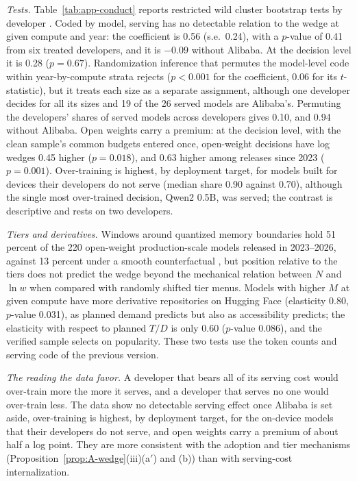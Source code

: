 \textit{Tests.} Table~\ref{tab:app-conduct} reports restricted wild cluster bootstrap tests by developer
\citep{cameron2008bootstrap,webb2023reworking}. Coded by model, serving has no detectable relation to the wedge at given
compute and year: the coefficient is 0.56 (s.e.\ 0.24), with a $p$-value of 0.41 from six treated developers, and it is
$-0.09$ without Alibaba. At the decision level it is 0.28 ($p=0.67$). Randomization inference that permutes the
model-level code within year-by-compute strata rejects ($p<0.001$ for the coefficient, 0.06 for its $t$-statistic), but it
treats each size as a separate assignment, although one developer decides for all its sizes and 19 of the 26 served
models are Alibaba's. Permuting the developers' shares of served models across developers
\citep{mackinnon2020randomization} gives 0.10, and 0.94 without Alibaba. Open weights carry a premium: at the decision
level, with the clean sample's common budgets entered once, open-weight decisions have log wedges 0.45 higher
($p=0.018$), and 0.63 higher among releases since 2023 ($p=0.001$). Over-training is highest, by deployment target, for
models built for devices their developers do not serve (median share 0.90 against 0.70), although the single most
over-trained decision, Qwen2 0.5B, was served; the contrast is descriptive and rests on two developers.

\textit{Tiers and derivatives.} Windows around quantized memory boundaries hold 51 percent of the 220 open-weight
production-scale models released in 2023--2026, against 13 percent under a smooth counterfactual
\citep{chetty2011adjustment,kleven2016bunching}, but position relative to the tiers does not predict the wedge beyond the
mechanical relation between $N$ and $\ln w$ when compared with randomly shifted tier menus. Models with higher $M$ at given
compute have more derivative repositories on Hugging Face (elasticity 0.80, $p$-value 0.031), as planned demand predicts
but also as accessibility predicts; the elasticity with respect to planned $T/D$ is only 0.60 ($p$-value 0.086), and the
verified sample selects on popularity. These two tests use the token counts and serving code of the previous version.

\textit{The reading the data favor.} A developer that bears all of its serving cost would over-train more the more it
serves, and a developer that serves no one would over-train less. The data show no detectable serving effect once Alibaba
is set aside, over-training is highest, by deployment target, for the on-device models that their developers do not
serve, and open weights carry a premium of about half a log point. They are more consistent with the adoption and tier
mechanisms (Proposition~\ref{prop:A-wedge}(iii)(a$'$) and (b)) than with serving-cost internalization.


